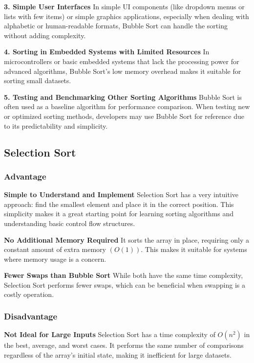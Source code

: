 \textbf{3. Simple User Interfaces }
   In simple UI components (like dropdown menus or lists with few items) or simple graphics applications, especially when dealing with alphabetic or human-readable formats, Bubble Sort can handle the sorting without adding complexity. 

\textbf{4. Sorting in Embedded Systems with Limited Resources }
   In microcontrollers or basic embedded systems that lack the processing power for advanced algorithms, Bubble Sort's low memory overhead makes it suitable for sorting small datasets. 

\textbf{5. Testing and Benchmarking Other Sorting Algorithms} 
   Bubble Sort is often used as a baseline algorithm for performance comparison. When testing new or optimized sorting methods, developers may use Bubble Sort for reference due to its predictability and simplicity. 

\subsection{Selection Sort}

\subsubsection{Advantage}
\textbf{Simple to Understand and Implement} 
Selection Sort has a very intuitive approach: find the smallest element and place it in the correct position. This simplicity makes it a great starting point for learning sorting algorithms and understanding basic control flow structures. 

\textbf{No Additional Memory Required} 
It sorts the array in place, requiring only a constant amount of extra memory $(O(1))$. This makes it suitable for systems where memory usage is a concern. 

\textbf{Fewer Swaps than Bubble Sort} 
While both have the same time complexity, Selection Sort performs fewer swaps, which can be beneficial when swapping is a costly operation. 

\subsubsection{Disadvantage}
\textbf{Not Ideal for Large Inputs} 
Selection Sort has a time complexity of $O(n^2)$ in the best, average, and worst cases. It performs the same number of comparisons regardless of the array’s initial state, making it inefficient for large datasets. 

